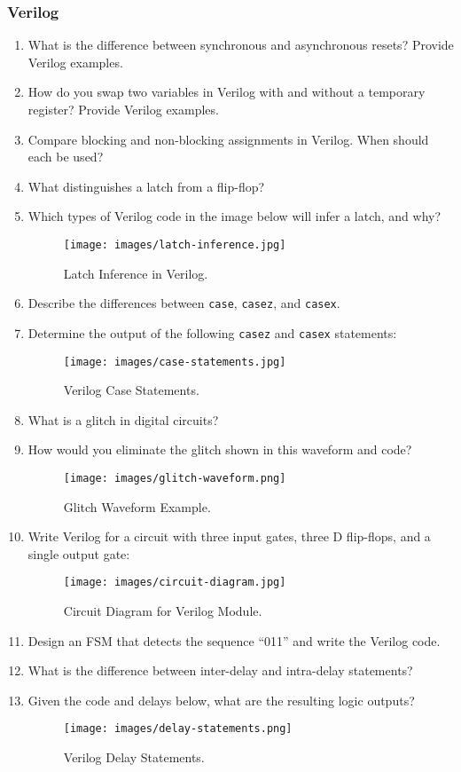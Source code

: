 \subsubsection*{Verilog}
\begin{enumerate}
    \item What is the difference between synchronous and asynchronous resets? Provide Verilog examples.
    \item How do you swap two variables in Verilog with and without a temporary register? Provide Verilog examples.
    \item Compare blocking and non-blocking assignments in Verilog. When should each be used?
    \item What distinguishes a latch from a flip-flop?
    \item Which types of Verilog code in the image below will infer a latch, and why?
        \begin{figure}[H]
            \centering
            \texttt{[image: images/latch-inference.jpg]}
            \caption{Latch Inference in Verilog.}
        \end{figure}
    \item Describe the differences between \texttt{case}, \texttt{casez}, and \texttt{casex}.
    \item Determine the output of the following \texttt{casez} and \texttt{casex} statements:
        \begin{figure}[H]
            \centering
            \texttt{[image: images/case-statements.jpg]}
            \caption{Verilog Case Statements.}
        \end{figure}
    \item What is a glitch in digital circuits?
    \item How would you eliminate the glitch shown in this waveform and code?
        \begin{figure}[H]
            \centering
            \texttt{[image: images/glitch-waveform.png]}
            \caption{Glitch Waveform Example.}
        \end{figure}
    \item Write Verilog for a circuit with three input gates, three D flip-flops, and a single output gate:
        \begin{figure}[H]
            \centering
            \texttt{[image: images/circuit-diagram.jpg]}
            \caption{Circuit Diagram for Verilog Module.}
        \end{figure}
    \item Design an FSM that detects the sequence “011” and write the Verilog code.
    \item What is the difference between inter-delay and intra-delay statements?
    \item Given the code and delays below, what are the resulting logic outputs?
        \begin{figure}[H]
            \centering
            \texttt{[image: images/delay-statements.png]}
            \caption{Verilog Delay Statements.}
        \end{figure}
\end{enumerate}

